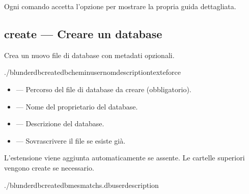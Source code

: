 \documentclass[letterpaper,10pt,italian]{sphinxmanual}
\begin{document}
\sphinxAtStartPar
Ogni comando accetta l’opzione  per mostrare la propria guida dettagliata.


\subsection{create — Creare un database}
\label{\detokenize{cli:create-creer-une-base-de-donnees}}
\sphinxAtStartPar
Crea un nuovo file di database con metadati opzionali.

\begin{sphinxVerbatim}[commandchars=\\\{\}]
./blunderdbcreate\PYGZhy{}\PYGZhy{}db\PYGZlt{}chemin\PYGZgt{}\PYG{o}{[}\PYGZhy{}\PYGZhy{}user\PYGZlt{}nom\PYGZgt{}\PYG{o}{]}\PYG{o}{[}\PYGZhy{}\PYGZhy{}description\PYGZlt{}texte\PYGZgt{}\PYG{o}{]}\PYG{o}{[}\PYGZhy{}\PYGZhy{}force\PYG{o}{]}
\end{sphinxVerbatim}

\sphinxAtStartPar
{}
\begin{itemize}
\item {} 
\sphinxAtStartPar
{} — Percorso del file di database da creare (obbligatorio).

\item {} 
\sphinxAtStartPar
{} — Nome del proprietario del database.

\item {} 
\sphinxAtStartPar
{} — Descrizione del database.

\item {} 
\sphinxAtStartPar
{} — Sovrascrivere il file se esiste già.

\end{itemize}

\sphinxAtStartPar
L’estensione  viene aggiunta automaticamente se assente. Le cartelle superiori vengono create se necessario.

\sphinxAtStartPar
{}

\begin{sphinxVerbatim}[commandchars=\\\{\}]
./blunderdbcreate\PYGZhy{}\PYGZhy{}dbmes\PYGZus{}matchs.db\PYGZhy{}\PYGZhy{}user\PYGZhy{}\PYGZhy{}description
\end{sphinxVerbatim}
\end{document}
